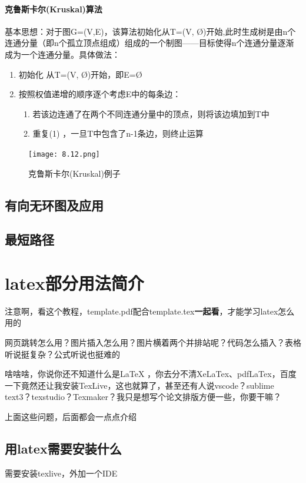 \documentclass[AutoFakeBold]{LZUThesis2007}
\begin{document}
				\subsubsection{克鲁斯卡尔(Kruskal)算法}
基本思想：对于图G=(V,E)，该算法初始化从T=(V, Ø)开始,此时生成树是由n个连通分量（即n个孤立顶点组成）组成的一个制图——目标使得n个连通分量逐渐成为一个连通分量。具体做法：
					\begin{enumerate}
						\item 初始化
						从T=(V, Ø)开始，即E=Ø
						\item 按照权值递增的顺序逐个考虑E中的每条边：
							\begin{enumerate}
								\item 若该边连通了在两个不同连通分量中的顶点，则将该边填加到T中
								\item 重复(1) ，一旦T中包含了n-1条边，则终止运算
							\end{enumerate}
					\end{enumerate}
\begin{figure}[H]
    \centering
    \texttt{[image: 8.12.png]}
    \caption{克鲁斯卡尔(Kruskal)例子}
    \label{fig_install_texlive}
\end{figure}

	\section{有向无环图及应用}
	\section{最短路径}



\chapter{latex部分用法简介}

注意啊，看这个教程，template.pdf配合template.tex\textbf{一起看}，才能学习latex怎么用的

网页跳转怎么用？图片插入怎么用？图片横着两个并排站呢？代码怎么插入？表格听说挺复杂？公式听说也挺难的

啥啥啥，你说你还不知道什么是LaTeX ，你去分不清XeLaTex、pdfLaTex，百度一下竟然还让我安装TexLive，这也就算了，甚至还有人说vscode？sublime text3？texstudio？Texmaker？我只是想写个论文排版方便一些，你要干嘛？

上面这些问题，后面都会一点点介绍

\section{用latex需要安装什么}
需要安装texlive，外加一个IDE
\end{document}
